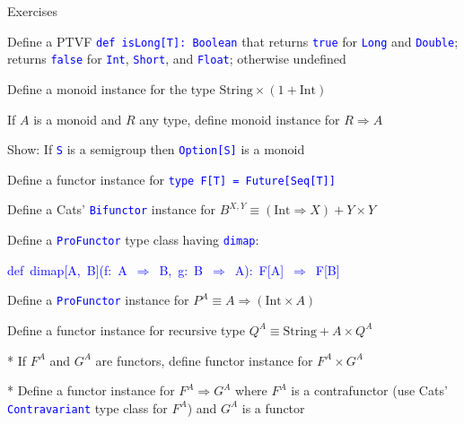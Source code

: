 \documentclass[english]{beamer}
\newenvironment{lyxcode}
   {\par\begin{list}{}{
     \setlength{\rightmargin}{\leftmargin}
     \setlength{\listparindent}{0pt}%
     \raggedright
     \setlength{\itemsep}{0pt}
     \setlength{\parsep}{0pt}
     \normalfont\ttfamily}%
    \def\{{\char`\{}
    \def\}{\char`\}}
    \def\textasciitilde{\char`\~}
    \item[]}
   {\end{list}}
\begin{document}
\begin{frame}{Exercises}

\begin{enumerate}
\item Define a PTVF \texttt{\textcolor{blue}{\footnotesize{}def isLong{[}T{]}:\ Boolean}}
that returns \texttt{\textcolor{blue}{\footnotesize{}true}} for \texttt{\textcolor{blue}{\footnotesize{}Long}}
and \texttt{\textcolor{blue}{\footnotesize{}Double}}; returns \texttt{\textcolor{blue}{\footnotesize{}false}}
for \texttt{\textcolor{blue}{\footnotesize{}Int}}, \texttt{\textcolor{blue}{\footnotesize{}Short}},
and \texttt{\textcolor{blue}{\footnotesize{}Float}}; otherwise undefined
\item Define a monoid instance for the type $\text{String}\times(1+\text{Int})$
\item If $A$ is a monoid and $R$ any type, define monoid instance for
$R\Rightarrow A$
\item Show: If \texttt{\textcolor{blue}{\footnotesize{}S}} is a semigroup
then \texttt{\textcolor{blue}{\footnotesize{}Option{[}S{]}}} is a
monoid
\item Define a functor instance for \texttt{\textcolor{blue}{\footnotesize{}type
F{[}T{]} = Future{[}Seq{[}T{]}{]}}}{\footnotesize \par}
\item Define a Cats' \texttt{\textcolor{blue}{\footnotesize{}Bifunctor}}
instance for $B^{X,Y}\equiv\left(\text{Int}\Rightarrow X\right)+Y\times Y$
\item Define a \texttt{\textcolor{blue}{\footnotesize{}ProFunctor}} type
class having \texttt{\textcolor{blue}{\footnotesize{}dimap}}:
\begin{lyxcode}
\textcolor{blue}{\footnotesize{}def~dimap{[}A,~B{]}(f:~A~$\Rightarrow$~B,~g:~B~$\Rightarrow$~A):~F{[}A{]}~$\Rightarrow$~F{[}B{]}}{\footnotesize \par}
\end{lyxcode}
Define a \texttt{\textcolor{blue}{\footnotesize{}ProFunctor}} instance
for $P^{A}\equiv A\Rightarrow\left(\text{Int}\times A\right)$
\item Define a functor instance for recursive type $Q^{A}\equiv\text{String}+A\times Q^{A}$
\item {*} If $F^{A}$ and $G^{A}$ are functors, define functor instance
for $F^{A}\times G^{A}$ 
\item {*} Define a functor instance for $F^{A}\Rightarrow G^{A}$ where
$F^{A}$ is a contrafunctor (use Cats' \texttt{\textcolor{blue}{\footnotesize{}Contravariant}}
type class for $F^{A}$) and $G^{A}$ is a functor
\end{enumerate}
\end{frame}
\end{document}

